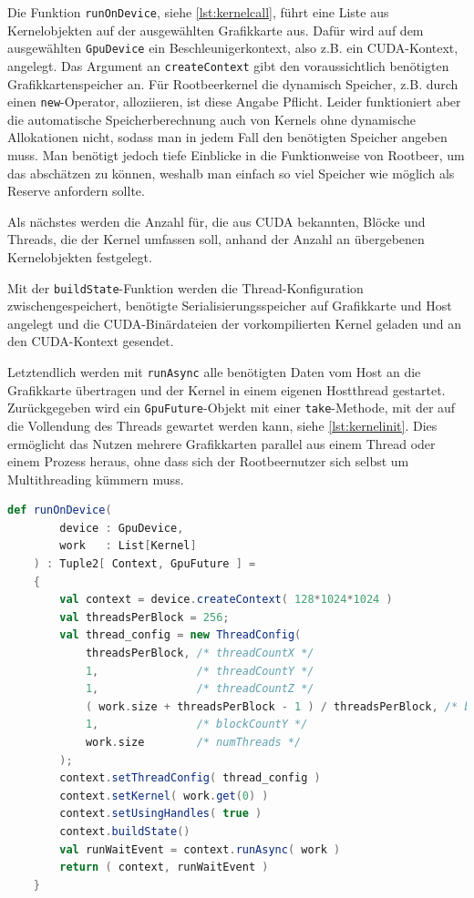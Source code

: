 Die Funktion \lstinline!runOnDevice!, siehe \autoref{lst:kernelcall}, führt eine Liste aus Kernelobjekten auf der ausgewählten Grafikkarte aus.
Dafür wird auf dem ausgewählten \lstinline!GpuDevice! ein Beschleunigerkontext, also z.B. ein CUDA-Kontext, angelegt. Das Argument an \lstinline!createContext! gibt den voraussichtlich benötigten Grafikkartenspeicher an. Für Rootbeerkernel die dynamisch Speicher, z.B. durch einen \lstinline!new!-Operator, alloziieren, ist diese Angabe Pflicht.
Leider funktioniert aber die automatische Speicherberechnung auch von Kernels ohne dynamische Allokationen nicht, sodass man in jedem Fall den benötigten Speicher angeben muss.
Man benötigt jedoch tiefe Einblicke in die Funktionweise von Rootbeer, um das abschätzen zu können, weshalb man einfach so viel Speicher wie möglich als Reserve anfordern sollte.

Als nächstes werden die Anzahl für, die aus CUDA bekannten, Blöcke und Threads, die der Kernel umfassen soll, anhand der Anzahl an übergebenen Kernelobjekten festgelegt.

Mit der \lstinline!buildState!-Funktion werden die Thread-Konfiguration zwischengespeichert, benötigte Serialisierungsspeicher auf Grafikkarte und Host angelegt und die CUDA-Binärdateien der vorkompilierten Kernel geladen und an den CUDA-Kontext gesendet.

Letztendlich werden mit \lstinline!runAsync! alle benötigten Daten vom Host an die Grafikkarte übertragen und der Kernel in einem eigenen Hostthread gestartet. Zurückgegeben wird ein \lstinline!GpuFuture!-Objekt mit einer \lstinline!take!-Methode, mit der auf die Vollendung des Threads gewartet werden kann, siehe \autoref{lst:kernelinit}. Dies ermöglicht das Nutzen mehrere Grafikkarten parallel aus einem Thread oder einem Prozess heraus, ohne dass sich der Rootbeernutzer sich selbst um Multithreading kümmern muss.

\begin{lstlisting}[language=scala,caption={Ausführen der Rootbeerkernels auf einer ausgewählten Grafikkarte, vgl. auch \lstinline!multiNode/multiGpu/scala/MonteCarloPi.scala! \cite{scaromare}},label=lst:kernelcall]
    def runOnDevice(
        device : GpuDevice,
        work   : List[Kernel]
    ) : Tuple2[ Context, GpuFuture ] =
    {
        val context = device.createContext( 128*1024*1024 )
        val threadsPerBlock = 256;
        val thread_config = new ThreadConfig(
            threadsPerBlock, /* threadCountX */
            1,               /* threadCountY */
            1,               /* threadCountZ */
            ( work.size + threadsPerBlock - 1 ) / threadsPerBlock, /* blockCountX */
            1,               /* blockCountY */
            work.size        /* numThreads */
        );
        context.setThreadConfig( thread_config )
        context.setKernel( work.get(0) )
        context.setUsingHandles( true )
        context.buildState()
        val runWaitEvent = context.runAsync( work )
        return ( context, runWaitEvent )
    }
\end{lstlisting}



